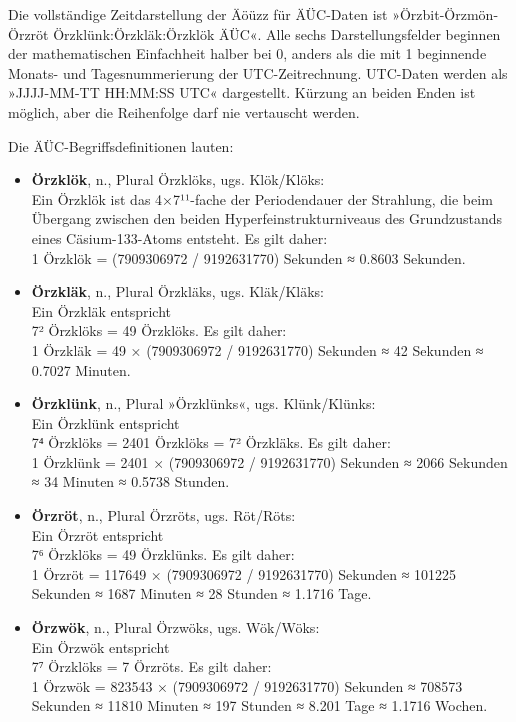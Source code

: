 Die vollständige Zeitdarstellung der Äöüzz für ÄÜC-Daten ist »Örzbit-Örzmön-Örzröt Örzklünk:Örzkläk:Örzklök ÄÜC«. Alle sechs Darstellungsfelder beginnen der mathematischen Einfachheit halber bei 0, anders als die mit 1 beginnende Monats- und Tagesnummerierung der UTC-Zeitrechnung. UTC-Daten werden als »JJJJ-MM-TT HH:MM:SS UTC« dargestellt. Kürzung an beiden Enden ist möglich, aber die Reihenfolge darf nie vertauscht werden.

Die ÄÜC-Begriffsdefinitionen lauten:

\begin{itemize}
    \item \textbf{Örzklök}, n., Plural Örzklöks, ugs. Klök/Klöks:\\ Ein Örzklök ist das 4×7¹¹-fache der Periodendauer der Strahlung, die beim Übergang zwischen den beiden Hyperfeinstrukturniveaus des Grundzustands eines Cäsium-133-Atoms entsteht. Es gilt daher:\\ 1 Örzklök = (7909306972 / 9192631770) Sekunden ≈ 0.8603 Sekunden.
    \item \textbf{Örzkläk}, n., Plural Örzkläks, ugs. Kläk/Kläks:\\ Ein Örzkläk entspricht\\ 7² Örzklöks = 49 Örzklöks. Es gilt daher:\\ 1 Örzkläk = 49 × (7909306972 / 9192631770) Sekunden ≈ 42 Sekunden ≈ 0.7027 Minuten.
    \item \textbf{Örzklünk}, n., Plural »Örzklünks«, ugs. Klünk/Klünks:\\ Ein Örzklünk entspricht\\ 7⁴ Örzklöks = 2401 Örzklöks = 7² Örzkläks. Es gilt daher:\\ 1 Örzklünk = 2401 × (7909306972 / 9192631770) Sekunden ≈ 2066 Sekunden ≈ 34 Minuten ≈ 0.5738 Stunden.
    \item \textbf{Örzröt}, n., Plural Örzröts, ugs. Röt/Röts:\\ Ein Örzröt entspricht\\ 7⁶ Örzklöks = 49 Örzklünks. Es gilt daher:\\ 1 Örzröt = 117649 × (7909306972 / 9192631770) Sekunden ≈ 101225 Sekunden ≈ 1687 Minuten ≈ 28 Stunden ≈ 1.1716 Tage.
    \item \textbf{Örzwök}, n., Plural Örzwöks, ugs. Wök/Wöks:\\ Ein Örzwök entspricht\\ 7⁷ Örzklöks = 7 Örzröts. Es gilt daher:\\ 1 Örzwök = 823543 × (7909306972 / 9192631770) Sekunden ≈ 708573 Sekunden ≈ 11810 Minuten ≈ 197 Stunden ≈ 8.201 Tage ≈ 1.1716 Wochen.

\end{itemize}
